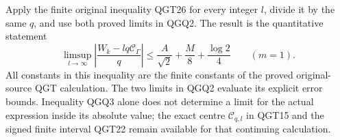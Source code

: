 Apply the finite original inequality QGT26 for every integer $l$,
divide it by the same $q$, and use both proved limits in QGQ2.
The result is the quantitative statement
\[
 \boxed{\displaystyle
 \limsup_{l\to\infty}
 \left|\frac{W_k-lq\mathcal C_\Gamma}{q}\right|
 \le\frac A{\sqrt2}+\frac M8+\frac{\log2}{4}
 \qquad(m=1).}
 \tag{QGQ3}
\]
All constants in this inequality are the finite constants of the
proved original-source QGT calculation. The two limits in QGQ2
evaluate its explicit error bounds. Inequality QGQ3 alone does not
determine a limit for the actual expression inside its absolute value;
the exact centre $\mathcal C_{q,l}$ in QGT15 and the signed finite
interval QGT22 remain available for that continuing calculation.
